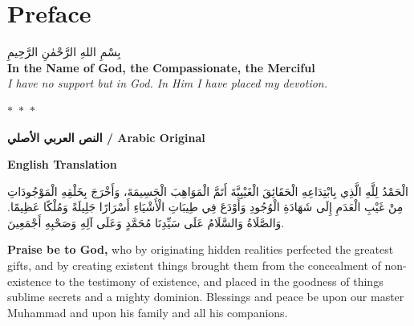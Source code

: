 \documentclass[11pt,a4paper]{article}
\theoremstyle{plain}
\theoremstyle{definition}
\theoremstyle{remark}
\newcommand{\ar}[1]{{\arabicfont\beginR #1\endR}}
\newcommand{\bilingualpair}[2]{%
  \par\noindent
  \begin{minipage}[t]{0.48\textwidth}
  #1
  \end{minipage}%
  \hfill
  \begin{minipage}[t]{0.48\textwidth}
  \vspace*{0pt}#2
  \end{minipage}\par\vspace{0.3cm}%
}
\newcommand{\ornament}{\begin{center}\textcolor{goldaccent}{$\ast$~$\ast$~$\ast$}\end{center}}
\begin{document}
\tableofcontents
\clearpage

\section*{Preface}

\begin{center}
\ar{\Large بِسْمِ اللهِ الرَّحْمٰنِ الرَّحِيمِ}\\[0.3cm]
\textbf{\large In the Name of God, the Compassionate, the Merciful}\\[0.3cm]
\textit{I have no support but in God. In Him I have placed my devotion.}
\end{center}

\ornament

\bilingualpair{\noindent\textcolor{arabicblue}{\textbf{\ar{النص العربي الأصلي / Arabic Original}}}}{\noindent\textcolor{sectioncolor}{\textbf{English Translation}}}

\vspace{0.3cm}

\bilingualpair{\ar{الْحَمْدُ لِلَّهِ الَّذِي بِابْتِدَاعِهِ الْحَقَائِقَ الْغَيْبِيَّةَ أَتَمَّ الْمَوَاهِبَ الْجَسِيمَةَ، وَأَخْرَجَ بِخَلْقِهِ الْمَوْجُودَاتِ مِنْ غَيْبِ الْعَدَمِ إِلَى شَهَادَةِ الْوُجُودِ وَأَوْدَعَ فِي طِيبَاتِ الْأَشْيَاءِ أَسْرَارًا جَلِيلَةً وَمُلْكًا عَظِيمًا. وَالصَّلَاةُ وَالسَّلَامُ عَلَى سَيِّدِنَا مُحَمَّدٍ وَعَلَى آلِهِ وَصَحْبِهِ أَجْمَعِينَ.}}{\noindent\textbf{Praise be to God,} who by originating hidden realities perfected the greatest gifts, and by creating existent things brought them from the concealment of non-existence to the testimony of existence, and placed in the goodness of things sublime secrets and a mighty dominion. Blessings and peace be upon our master Muhammad and upon his family and all his companions.}

\vspace{0.3cm}
\end{document}

